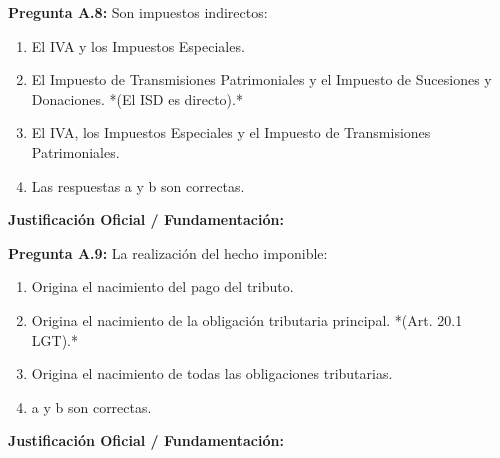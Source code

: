 \documentclass[11pt,a4paper,openany]{article}
\begin{document}
\noindent\textbf{\sffamily Pregunta A.8:} Son impuestos indirectos:\\[0.15cm]
\begin{enumerate}[label=\textbf{\alph*)},leftmargin=1.8em,itemsep=1.5pt,topsep=2pt,partopsep=0pt,parsep=0pt]
    \item El IVA y los Impuestos Especiales.
    \item El Impuesto de Transmisiones Patrimoniales y el Impuesto de Sucesiones y Donaciones. *(El ISD es directo).*
    \item El IVA, los Impuestos Especiales y el Impuesto de Transmisiones Patrimoniales.
    \item Las respuestas a y b son correctas.
\end{enumerate}
\begin{solucionBox}
\textbf{Justificación Oficial / Fundamentación:}\\[0.1cm]

\end{solucionBox}
\vspace{0.35cm}

\noindent\textbf{\sffamily Pregunta A.9:} La realización del hecho imponible:\\[0.15cm]
\begin{enumerate}[label=\textbf{\alph*)},leftmargin=1.8em,itemsep=1.5pt,topsep=2pt,partopsep=0pt,parsep=0pt]
    \item Origina el nacimiento del pago del tributo.
    \item Origina el nacimiento de la obligación tributaria principal. *(Art. 20.1 LGT).*
    \item Origina el nacimiento de todas las obligaciones tributarias.
    \item a y b son correctas.
\end{enumerate}
\begin{solucionBox}
\textbf{Justificación Oficial / Fundamentación:}\\[0.1cm]

\end{solucionBox}
\vspace{0.35cm}
\end{document}

